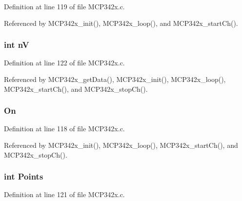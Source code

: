 Definition at line 119 of file M\-C\-P342x.\-c.



Referenced by M\-C\-P342x\-\_\-init(), M\-C\-P342x\-\_\-loop(), and M\-C\-P342x\-\_\-start\-Ch().

\hypertarget{structtag_m_c_p342x_c_h_affe84419e6828165e18a52d724db74fd}{
\subsubsection[{n\-V}]{\setlength{\rightskip}{0pt plus 5cm}int n\-V}}\label{structtag_m_c_p342x_c_h_affe84419e6828165e18a52d724db74fd}


Definition at line 122 of file M\-C\-P342x.\-c.



Referenced by M\-C\-P342x\-\_\-get\-Data(), M\-C\-P342x\-\_\-init(), M\-C\-P342x\-\_\-loop(), M\-C\-P342x\-\_\-start\-Ch(), and M\-C\-P342x\-\_\-stop\-Ch().

\hypertarget{structtag_m_c_p342x_c_h_a2d1f06ea4f608600e241eeded488b0df}{
\subsubsection[{On}]{ On}}\label{structtag_m_c_p342x_c_h_a2d1f06ea4f608600e241eeded488b0df}


Definition at line 118 of file M\-C\-P342x.\-c.



Referenced by M\-C\-P342x\-\_\-init(), M\-C\-P342x\-\_\-loop(), M\-C\-P342x\-\_\-start\-Ch(), and M\-C\-P342x\-\_\-stop\-Ch().

\hypertarget{structtag_m_c_p342x_c_h_a4e6fa56ee9cc8075628f24656cbe03ba}{
\subsubsection[{Points}]{\setlength{\rightskip}{0pt plus 5cm}int Points}}\label{structtag_m_c_p342x_c_h_a4e6fa56ee9cc8075628f24656cbe03ba}


Definition at line 121 of file M\-C\-P342x.\-c.



